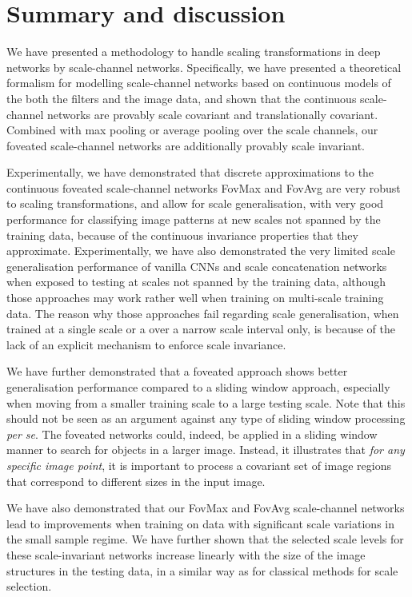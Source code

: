 \documentclass[twocolumn,runningheads]{svjour3}
\begin{document}
\section{Summary and discussion}

We have presented a methodology to handle scaling transformations in
deep networks by scale-channel networks.
Spec\-ifically, we have presented a theoretical formalism for modelling scale-channel networks
based on continuous models of the both the filters and the image data,
and shown that the continuous scale-channel networks are provably scale
covariant and translationally covariant. Combined with max pooling or
average pooling over the scale channels, our fove\-ated scale-channel networks
are additionally provably scale invariant.

Experimentally, we have demonstrated that discrete approximations
to the continuous foveated scale-channel networks FovMax and FovAvg are very robust to scaling
transformations, and allow for scale generalisation, with very good
performance for classifying image patterns at new scales not spanned by
the training data, because of the continuous invariance properties
that they approximate.
Experimentally, we have also demonstrated the very 
limited scale generalisation performance of vanilla CNNs and
scale concatenation networks 
when exposed to testing at scales not spanned by the training data,
although those approaches may work rather well when training on multi-scale training data. 
The reason why those approaches fail regarding scale generalisation,
when trained at a single scale or a over a narrow scale interval only,
is because of the lack of an explicit mechanism to enforce scale invariance.

We have further demonstrated that a foveated approach shows better generalisation performance compared to a sliding window approach, especially when moving from a smaller training scale to a large testing scale. Note that this should not be seen as an argument against any type of sliding window processing \emph{per se}. The foveated networks could, indeed, be applied in a sliding window manner to search for objects in a larger image. Instead, it illustrates that \emph{for any specific image point}, it is important to process a covariant set of image regions that correspond to different sizes in the input image. 

We have also demonstrated that our Fov\-Max and Fov\-Avg scale-channel
networks lead to improvements when training on data with significant
scale variations in the small sample regime.
We have further shown that the selected scale levels for these scale-invariant networks increase linearly with the size of the image
structures in the testing data, in a similar way as for classical
methods for scale selection. 
\end{document}
